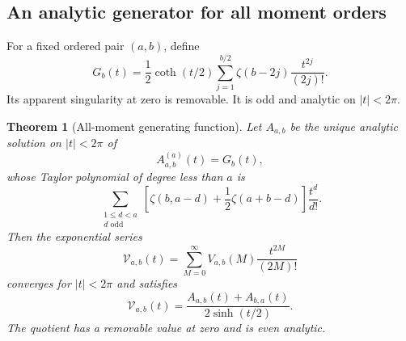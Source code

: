 \documentclass[11pt,letterpaper]{article}
\numberwithin{equation}{section}
\theoremstyle{plain}
\newtheorem{theorem}{Theorem}[section]
\theoremstyle{definition}
\theoremstyle{remark}
\begin{document}
\subsection{An analytic generator for all moment orders}

For a fixed ordered pair $(a,b)$, define
\begin{equation}\label{mt:G}
 G_b(t)=\frac12\coth(t/2)
             \sum_{j=1}^{b/2}\zeta(b-2j)\frac{t^{2j}}{(2j)!}.
\end{equation}
Its apparent singularity at zero is removable. It is odd and analytic
on $|t|<2\pi$.

\begin{theorem}[All-moment generating function]
\label{mt:generator}
Let $A_{a,b}$ be the unique analytic solution on $|t|<2\pi$ of
\begin{equation}\label{mt:generator-ode}
 A_{a,b}^{(a)}(t)=G_b(t),
\end{equation}
whose Taylor polynomial of degree less than $a$ is
\begin{equation}\label{mt:initial-data}
 \sum_{\substack{1\le d<a\\d\text{ odd}}}
  \left[\zeta(b,a-d)+\frac12\zeta(a+b-d)\right]\frac{t^d}{d!}.
\end{equation}
Then the exponential series
\begin{equation}\label{mt:moment-egf}
 \mathscr V_{a,b}(t)=\sum_{M=0}^{\infty}
                      V_{a,b}(M)\frac{t^{2M}}{(2M)!}
\end{equation}
converges for $|t|<2\pi$ and satisfies
\begin{equation}\label{mt:generator-formula}
 \boxed{\displaystyle
 \mathscr V_{a,b}(t)=
       \frac{A_{a,b}(t)+A_{b,a}(t)}{2\sinh(t/2)}.}
\end{equation}
The quotient has a removable value at zero and is even analytic.
\end{theorem}
\end{document}
